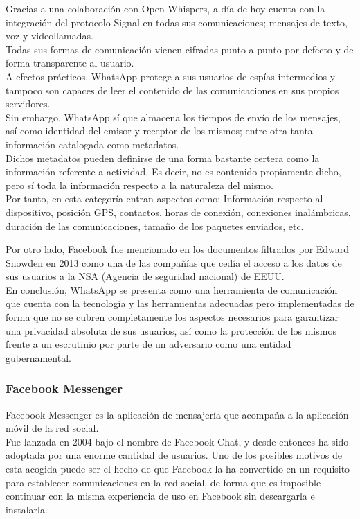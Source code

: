 Gracias a una colaboración con Open Whispers, a día de hoy cuenta con la integración del protocolo Signal en todas sus comunicaciones; mensajes de texto, voz y videollamadas. \\ Todas sus formas de comunicación vienen cifradas punto a punto por defecto y de forma transparente al usuario. \\
A efectos prácticos, WhatsApp protege a sus usuarios de espías intermedios y tampoco son capaces de leer el contenido de las comunicaciones en sus propios servidores. \\

Sin embargo, WhatsApp sí que almacena los tiempos de envío de los mensajes, así como identidad del emisor y receptor de los mismos; entre otra tanta información catalogada como metadatos. \\

Dichos metadatos pueden definirse de una forma bastante certera como la información referente a actividad. Es decir, no es contenido propiamente dicho, pero sí toda la información respecto a la naturaleza del mismo. \\
Por tanto, en esta categoría entran aspectos como: Información respecto al dispositivo, posición GPS, contactos, horas de conexión, conexiones inalámbricas, duración de las comunicaciones, tamaño de los paquetes enviados, etc.

Por otro lado, Facebook fue mencionado en los documentos filtrados por Edward Snowden en 2013 como una de las compañías que cedía el acceso a los datos de sus usuarios a la NSA (Agencia de seguridad nacional) de EEUU. \\

En conclusión, WhatsApp se presenta como una herramienta de comunicación que cuenta con la tecnología y las herramientas adecuadas pero implementadas de forma que no se cubren completamente los aspectos necesarios para garantizar una privacidad absoluta de sus usuarios, así como la protección de los mismos frente a un escrutinio por parte de un adversario como una entidad gubernamental. \\

\subsubsection {Facebook Messenger}

Facebook Messenger es la aplicación de mensajería que acompaña a la aplicación móvil de la red social. \\
Fue lanzada en 2004 bajo el nombre de Facebook Chat, y desde entonces ha sido adoptada por una enorme cantidad de usuarios. Uno de los posibles motivos de esta acogida puede ser el hecho de que Facebook la ha convertido en un requisito para establecer comunicaciones en la red social, de forma que es imposible continuar con la misma experiencia de uso en Facebook sin descargarla e instalarla. \\

